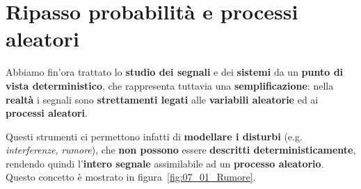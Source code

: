 \chapter{Ripasso probabilità e processi aleatori}

Abbiamo fin'ora trattato lo \textbf{studio dei segnali} e dei \textbf{sistemi}
da un \textbf{punto di vista deterministico}, che rappresenta tuttavia
una \textbf{semplificazione}: nella \textbf{realtà} i segnali
sono \textbf{strettamenti legati} alle \textbf{variabili aleatorie} ed
ai \textbf{processi aleatori}.

Questi strumenti ci permettono infatti di \textbf{modellare i disturbi}
(e.g. \textit{interferenze}, \textit{rumore}), che \textbf{non possono} 
essere \textbf{descritti deterministicamente}, rendendo quindi
l'\textbf{intero segnale} assimilabile ad un \textbf{processo aleatorio}.
Questo concetto è mostrato in figura~\ref{fig:07_01_Rumore}.

